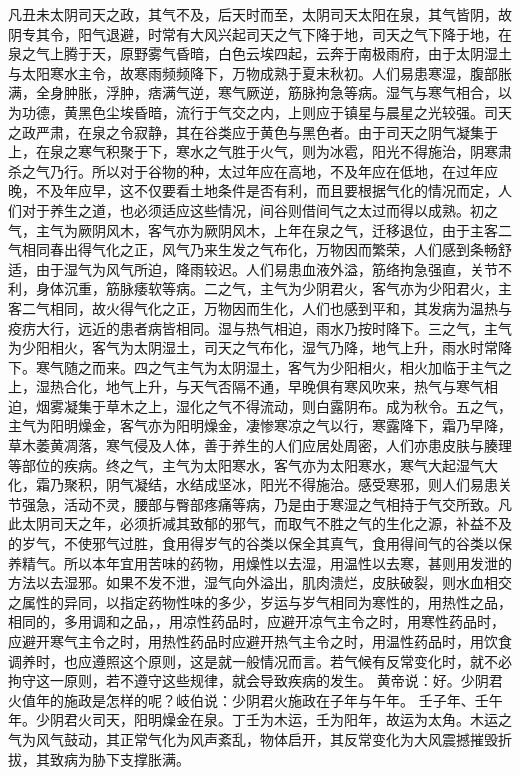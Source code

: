 \documentclass[12pt,UTF8]{ctexbook}
\begin{document}
凡丑未太阴司天之政，其气不及，后天时而至，太阴司天太阳在泉，其气皆阴，故阴专其令，阳气退避，时常有大风兴起司天之气下降于地，司天之气下降于地，在泉之气上腾于天，原野雾气昏暗，白色云埃四起，云奔于南极雨府，由于太阴湿土与太阳寒水主令，故寒雨频频降下，万物成熟于夏末秋初。人们易患寒湿，腹部胀满，全身肿胀，浮肿，痞满气逆，寒气厥逆，筋脉拘急等病。湿气与寒气相合，以为功德，黄黑色尘埃昏暗，流行于气交之内，上则应于镇星与晨星之光较强。司天之政严肃，在泉之令寂静，其在谷类应于黄色与黑色者。由于司天之阴气凝集于上，在泉之寒气积聚于下，寒水之气胜于火气，则为冰雹，阳光不得施治，阴寒肃杀之气乃行。所以对于谷物的种，太过年应在高地，不及年应在低地，在过年应晚，不及年应早，这不仅要看土地条件是否有利，而且要根据气化的情况而定，人们对于养生之道，也必须适应这些情况，间谷则借间气之太过而得以成熟。初之气，主气为厥阴风木，客气亦为厥阴风木，上年在泉之气，迁移退位，由于主客二气相同春出得气化之正，风气乃来生发之气布化，万物因而繁荣，人们感到条畅舒适，由于湿气为风气所迫，降雨较迟。人们易患血液外溢，筋络拘急强直，关节不利，身体沉重，筋脉痿软等病。二之气，主气为少阴君火，客气亦为少阳君火，主客二气相同，故火得气化之正，万物因而生化，人们也感到平和，其发病为温热与疫疠大行，远近的患者病皆相同。湿与热气相迫，雨水乃按时降下。三之气，主气为少阳相火，客气为太阴湿土，司天之气布化，湿气乃降，地气上升，雨水时常降下。寒气随之而来。四之气主气为太阴湿土，客气为少阳相火，相火加临于主气之上，湿热合化，地气上升，与天气否隔不通，早晚俱有寒风吹来，热气与寒气相迫，烟雾凝集于草木之上，湿化之气不得流动，则白露阴布。成为秋令。五之气，主气为阳明燥金，客气亦为阳明燥金，凄惨寒凉之气以行，寒露降下，霜乃早降，草木萎黄凋落，寒气侵及人体，善于养生的人们应居处周密，人们亦患皮肤与腠理等部位的疾病。终之气，主气为太阳寒水，客气亦为太阳寒水，寒气大起湿气大化，霜乃聚积，阴气凝结，水结成坚冰，阳光不得施治。感受寒邪，则人们易患关节强急，活动不灵，腰部与臀部疼痛等病，乃是由于寒湿之气相持于气交所致。凡此太阴司天之年，必须折减其致郁的邪气，而取气不胜之气的生化之源，补益不及的岁气，不使邪气过胜，食用得岁气的谷类以保全其真气，食用得间气的谷类以保养精气。所以本年宜用苦味的药物，用燥性以去湿，用温性以去寒，甚则用发泄的方法以去湿邪。如果不发不泄，湿气向外溢出，肌肉溃烂，皮肤破裂，则水血相交之属性的异同，以指定药物性味的多少，岁运与岁气相同为寒性的，用热性之品，相同的，多用调和之品，，用凉性药品时，应避开凉气主令之时，用寒性药品时，应避开寒气主令之时，用热性药品时应避开热气主令之时，用温性药品时，用饮食调养时，也应遵照这个原则，这是就一般情况而言。若气候有反常变化时，就不必拘守这一原则，若不遵守这些规律，就会导致疾病的发生。
黄帝说：好。少阴君火值年的施政是怎样的呢？岐伯说：少阴君火施政在子年与午年。
壬子年、壬午年。少阴君火司天，阳明燥金在泉。丁壬为木运，壬为阳年，故运为太角。木运之气为风气鼓动，其正常气化为风声紊乱，物体启开，其反常变化为大风震撼摧毁折拔，其致病为胁下支撑胀满。
\end{document}
